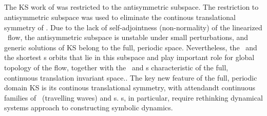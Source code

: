 

\subsection{\Eqva}

The KS work
of 
was restricted to the antisymmetric subspace.
The restriction to antisymmetric subspace was used
to eliminate the continous translational symmetry of \KSe.
Due to the lack of self-adjointness
(non-normality) of the linearized \KS\ flow, 
the antisymmetric subspace
is unstable under small perturbations, and generic solutions of 
KS belong to the full, periodic space.
Nevertheless, 
the \eqva\ and the shortest \po s orbits that lie in this subspace
and play important role for global topology of the flow,
together
with the \reqva\ and \rpo s
characteristic of the full, continuous translation invariant space..
The key new feature of the full, periodic domain
KS is its continous translational symmetry,
with attendandt continuous families of
\reqva\ (travelling waves) and \rpo s.
\Rpo s, in particular, require rethinking dynamical systems
approach to constructing symbolic dynamics. 

